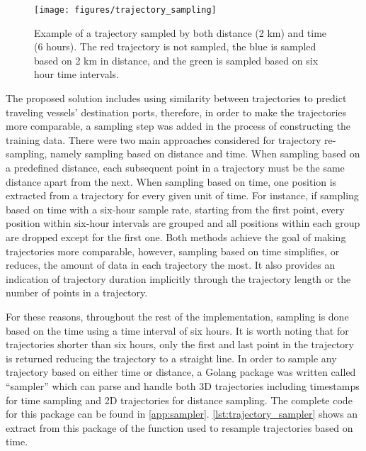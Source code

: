 \begin{figure}[htbp]  %
    \centering
    \texttt{[image: figures/trajectory\_sampling]}
    \caption{Example of a trajectory sampled by both distance (2 km) and time (6 hours). The red trajectory is not sampled, the blue is sampled based on 2 km in distance, and the green is sampled based on six hour time intervals.}
    \label{fig:trajectory_sampling}
\end{figure}

The proposed solution includes using similarity between trajectories to predict traveling vessels' destination ports, therefore, in order to make the trajectories more comparable, a sampling step was added in the process of constructing the training data. There were two main approaches considered for trajectory re-sampling, namely sampling based on distance and time. When sampling based on a predefined distance, each subsequent point in a trajectory must be the same distance apart from the next. When sampling based on time, one position is extracted from a trajectory for every given unit of time. For instance, if sampling based on time with a six-hour sample rate, starting from the first point, every position within six-hour intervals are grouped and all positions within each group are dropped except for the first one. Both methods achieve the goal of making trajectories more comparable, however, sampling based on time simplifies, or reduces, the amount of data in each trajectory the most. It also provides an indication of trajectory duration implicitly through the trajectory length or the number of points in a trajectory.

For these reasons, throughout the rest of the implementation, sampling is done based on the time using a time interval of six hours. It is worth noting that for trajectories shorter than six hours, only the first and last point in the trajectory is returned reducing the trajectory to a straight line. In order to sample any trajectory based on either time or distance, a Golang package was written called ``sampler'' which can parse and handle both 3D trajectories including timestamps for time sampling and 2D trajectories for distance sampling. The complete code for this package can be found in \cref{app:sampler}. \cref{lst:trajectory_sampler} shows an extract from this package of the function used to resample trajectories based on time.

